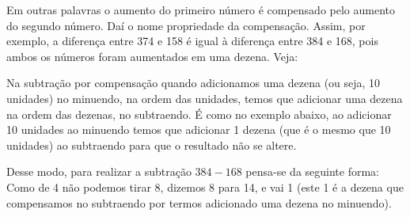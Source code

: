 \begin{refsection}
    Em outras palavras o aumento do primeiro número é compensado pelo aumento do segundo número. Daí o nome propriedade da compensação. Assim, por exemplo, a diferença entre 374 e 158 é igual à diferença entre 384 e 168, pois ambos os números foram aumentados em uma dezena. Veja:

    \begin{center}
        \hspace{90pt}
    \end{center}

    Na subtração por compensação quando adicionamos uma dezena (ou seja, 10 unidades) no minuendo, na ordem das unidades, temos que adicionar uma dezena na ordem das dezenas, no subtraendo. É como no exemplo abaixo, ao adicionar 10 unidades ao minuendo temos que adicionar 1 dezena (que é o mesmo que 10 unidades) ao subtraendo para que o resultado não se altere. 

    Desse modo, para realizar a subtração $384 - 168$ pensa-se da seguinte forma: Como de 4 não podemos tirar 8, dizemos 8 para 14, e vai 1 (este 1 é a dezena que compensamos no subtraendo por termos adicionado uma dezena no minuendo).


\end{refsection}
